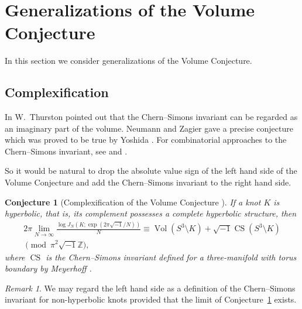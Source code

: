 \documentclass{amsart}
\newcommand{\Z}{\mathbb{Z}}
\newcommand{\Vol}{\operatorname{Vol}}
\newcommand{\CS}{\operatorname{CS}}
\newtheorem{conjecture}[theorem]{Conjecture}
\theoremstyle{definition}
\theoremstyle{remark}
\newtheorem{remark}[theorem]{Remark}
\numberwithin{equation}{section}
\begin{document}
\section{Generalizations of the Volume Conjecture}
\label{sec:generalization}
In this section we consider generalizations of the Volume Conjecture.
\subsection{Complexification}
In \cite{Thurston:BULAM31982} W.~Thurston pointed out that the Chern--Simons invariant \cite{Chern/Simons:ANNMA21974} can be regarded as an imaginary part of the volume.
Neumann and Zagier gave a precise conjecture \cite[Conjecture, p.~309]{Neumann/Zagier:TOPOL85} which was proved to be true by Yoshida \cite{Yoshida:INVEM85}.
For combinatorial approaches to the Chern--Simons invariant, see \cite{Neumann1992} and \cite{Zickert:DUKMJ2009}.
\par
So it would be natural to drop the absolute value sign of the left hand side of the Volume Conjecture and add the Chern--Simons invariant to the right hand side.
\begin{conjecture}[Complexification of the Volume Conjecture
\cite{Murakami/Murakami/Okamoto/Takata/Yokota:EXPMA02}]
\label{conj:CVC}
If a knot $K$ is hyperbolic, that is, its complement possesses a complete hyperbolic structure, then
\begin{multline*}
  2\pi\lim_{N\to\infty}\frac{\log J_N(K;\exp(2\pi\sqrt{-1}/N)) }{N}
  \equiv
  \Vol(S^3\setminus{K})+\sqrt{-1}\CS(S^3\setminus{K})
  \\
  \pmod{\pi^2\sqrt{-1}\Z},
\end{multline*}
where $\CS$ is the Chern--Simons invariant defined for a three-manifold with torus boundary by Meyerhoff \cite{Meyerhoff:density}.
\end{conjecture}
\begin{remark}
We may regard the left hand side as a definition of the Chern--Simons invariant for non-hyperbolic knots provided that the limit of Conjecture~\ref{conj:CVC} exists.
\end{remark}
\end{document}
